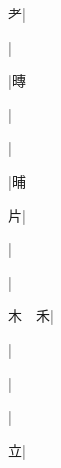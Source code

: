 \begin{multicols}{2}
{{\cjk{}{\cnsym{}　}{\cnsym{}　}耂}|{}\par
{\cjk{}{\cnsym{}　}{\cnsym{}　}{\cnsym{}　}}|{}\par
{\cjk{}{\cnsym{}　}{\cnsym{}　}{\cnsym{}　}}|{\cjk{}暷}\par
{\cjk{}{\cnsym{}　}{\cnsym{}　}{\cnsym{}　}}|{}\par
{}|{}\par
{\cjk{}{\cnsym{}　}{\cnsym{}　}{\cnsym{}　}}|{\cjk{}晡}\par
{\cjk{}{\cnsym{}　}{\cnsym{}　}片}|{}\par
{\cjk{}{\cnsym{}　}{\cnsym{}　}{\cnsym{}　}}|{}\par
{\cjk{}{\cnsym{}　}{\cnsym{}　}{\cnsym{}　}}|{}\par
{\cjk{}木{\cnsym{}　}禾}|{}\par
{\cjk{}{\cnsym{}　}{\cnsym{}　}{\cnsym{}　}}|{}\par
{\cjk{}{\cnsym{}　}{\cnsym{}　}{\cnsym{}　}}|{}\par
{\cjk{}{\cnsym{}　}{\cnsym{}　}{\cnsym{}　}}|{}\par
{\cjk{}{\cnsym{}　}{\cnsym{}　}立}|{}\par
}
\end{multicols}
